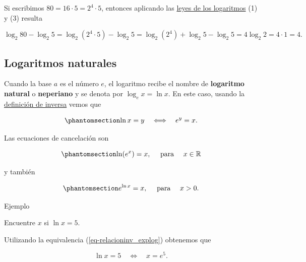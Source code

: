 \documentclass[
  letterpaper,
]{book}
\theoremstyle{plain}
\theoremstyle{remark}
\begin{document}
\begin{tcolorbox}[enhanced jigsaw, opacityback=0, left=2mm, opacitybacktitle=0.6, toprule=.15mm, bottomrule=.15mm, colbacktitle=quarto-callout-tip-color!10!white, titlerule=0mm, bottomtitle=1mm, title=\textcolor{quarto-callout-tip-color}{\faLightbulb}\hspace{0.5em}{Solución}, toptitle=1mm, colframe=quarto-callout-tip-color-frame, colback=white, breakable, rightrule=.15mm, arc=.35mm, leftrule=.75mm, coltitle=black]

Si escribimos \(80=16\cdot 5=2^4\cdot 5\), entonces aplicando las
\hyperref[propo-leyes-logaritmos]{leyes de los logaritmos} (1) y (3)
resulta

\[
\log_2 80-\log_2 5=\log_2(2^4\cdot 5)-\log_2 5=\log_2(2^4)+\log_2 5-\log_2 5=4\log_2 2=4\cdot 1=4.
\]

\end{tcolorbox}

\subsection{Logaritmos naturales}\label{logaritmos-naturales}

Cuando la base \(a\) es el número \(e\), el logaritmo recibe el nombre
de \textbf{logaritmo natural} o \textbf{neperiano} y se denota por
\(\log_e x=\ln x\). En este caso, usando la
\hyperref[eq-funcion_inversa]{definición de inversa} vemos que

\begin{equation}\phantomsection\label{eq-relacioninv_explog}{
\ln x=y \quad\Longleftrightarrow\quad e^y=x.
}\end{equation}

Las ecuaciones de cancelación son

\begin{equation}\phantomsection\label{eq-cancelacion_lnexp}{
\ln (e^x)=x, \quad \text{ para } \quad  x\in \mathbb{R}
}\end{equation}

y también

\begin{equation}\phantomsection\label{eq-cancelacion_expln}{
e^{\ln x}=x, \quad \text{ para } \quad x>0.
}\end{equation}

Ejemplo

Encuentre \(x\) si \(\ln x=5\).

\begin{tcolorbox}[enhanced jigsaw, opacityback=0, left=2mm, opacitybacktitle=0.6, toprule=.15mm, bottomrule=.15mm, colbacktitle=quarto-callout-tip-color!10!white, titlerule=0mm, bottomtitle=1mm, title=\textcolor{quarto-callout-tip-color}{\faLightbulb}\hspace{0.5em}{Solución}, toptitle=1mm, colframe=quarto-callout-tip-color-frame, colback=white, breakable, rightrule=.15mm, arc=.35mm, leftrule=.75mm, coltitle=black]

Utilizando la equivalencia (\ref{eq-relacioninv_explog}) obtenemos que

\[
\ln x=5 \quad \Longleftrightarrow \quad x=e^5.
\]

\end{tcolorbox}
\end{document}
